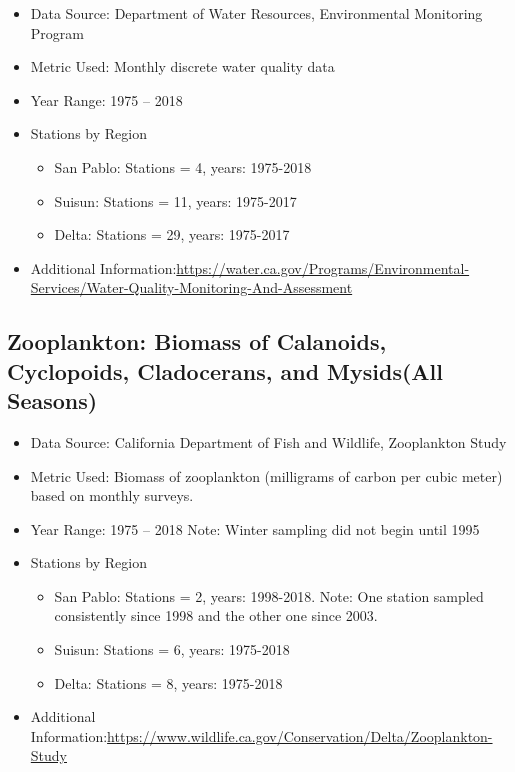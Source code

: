 \documentclass[
]{book}
\providecommand{\tightlist}{%
  \setlength{\itemsep}{0pt}\setlength{\parskip}{0pt}}
\begin{document}
\begin{itemize}
\tightlist
\item
  Data Source: Department of Water Resources, Environmental Monitoring Program
\item
  Metric Used: Monthly discrete water quality data
\item
  Year Range: 1975 -- 2018
\item
  Stations by Region

  \begin{itemize}
  \tightlist
  \item
    San Pablo: Stations = 4, years: 1975-2018
  \item
    Suisun: Stations = 11, years: 1975-2017
  \item
    Delta: Stations = 29, years: 1975-2017
  \end{itemize}
\item
  Additional Information:\url{https://water.ca.gov/Programs/Environmental-Services/Water-Quality-Monitoring-And-Assessment}
\end{itemize}

\hypertarget{zooplankton-biomass-of-calanoids-cyclopoids-cladocerans-and-mysidsall-seasons}{%
\subsection{Zooplankton: Biomass of Calanoids, Cyclopoids, Cladocerans, and Mysids(All Seasons)}\label{zooplankton-biomass-of-calanoids-cyclopoids-cladocerans-and-mysidsall-seasons}}

\begin{itemize}
\tightlist
\item
  Data Source: California Department of Fish and Wildlife, Zooplankton Study
\item
  Metric Used: Biomass of zooplankton (milligrams of carbon per cubic meter) based on monthly surveys.
\item
  Year Range: 1975 -- 2018 Note: Winter sampling did not begin until 1995
\item
  Stations by Region

  \begin{itemize}
  \tightlist
  \item
    San Pablo: Stations = 2, years: 1998-2018. Note: One station sampled consistently since 1998 and the other one since 2003.
  \item
    Suisun: Stations = 6, years: 1975-2018
  \item
    Delta: Stations = 8, years: 1975-2018
  \end{itemize}
\item
  Additional Information:\url{https://www.wildlife.ca.gov/Conservation/Delta/Zooplankton-Study}
\end{itemize}
\end{document}
